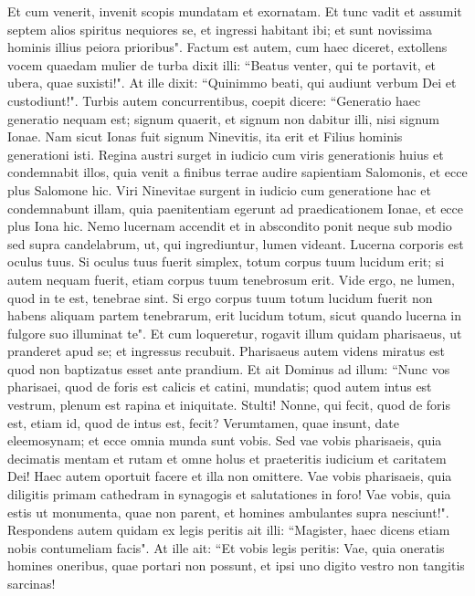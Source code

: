 \begin{biblechapter}
\verse Et cum venerit, invenit scopis mundatam et exornatam. 
\verse Et tunc vadit et assumit septem alios spiritus nequiores se, et ingressi habitant ibi; et sunt novissima hominis illius peiora prioribus". 
\verse Factum est autem, cum haec diceret, extollens vocem quaedam mulier de turba dixit illi: “Beatus venter, qui te portavit, et ubera, quae suxisti!". 
\verse At ille dixit: “Quinimmo beati, qui audiunt verbum Dei et custodiunt!". 
\verse Turbis autem concurrentibus, coepit dicere: “Generatio haec generatio nequam est; signum quaerit, et signum non dabitur illi, nisi signum Ionae. 
\verse Nam sicut Ionas fuit signum Ninevitis, ita erit et Filius hominis generationi isti.  
\verse Regina austri surget in iudicio cum viris generationis huius et condemnabit illos, quia venit a finibus terrae audire sapientiam Salomonis, et ecce plus Salomone hic. 
\verse Viri Ninevitae surgent in iudicio cum generatione hac et condemnabunt illam, quia paenitentiam egerunt ad praedicationem Ionae, et ecce plus Iona hic. 
\verse Nemo lucernam accendit et in abscondito ponit neque sub modio sed supra candelabrum, ut, qui ingrediuntur, lumen videant. 
\verse Lucerna corporis est oculus tuus. Si oculus tuus fuerit simplex, totum corpus tuum lucidum erit; si autem nequam fuerit, etiam corpus tuum tenebrosum erit. 
\verse Vide ergo, ne lumen, quod in te est, tenebrae sint. 
\verse Si ergo corpus tuum totum lucidum fuerit non habens aliquam partem tenebrarum, erit lucidum totum, sicut quando lucerna in fulgore suo illuminat te". 
\verse Et cum loqueretur, rogavit illum quidam pharisaeus, ut pranderet apud se; et ingressus recubuit. 
\verse Pharisaeus autem videns miratus est quod non baptizatus esset ante prandium. 
\verse Et ait Dominus ad illum: “Nunc vos pharisaei, quod de foris est calicis et catini, mundatis; quod autem intus est vestrum, plenum est rapina et iniquitate. 
\verse Stulti! Nonne, qui fecit, quod de foris est, etiam id, quod de intus est, fecit? 
\verse Verumtamen, quae insunt, date eleemosynam; et ecce omnia munda sunt vobis. 
\verse Sed vae vobis pharisaeis, quia decimatis mentam et rutam et omne holus et praeteritis iudicium et caritatem Dei! Haec autem oportuit facere et illa non omittere. 
\verse Vae vobis pharisaeis, quia diligitis primam cathedram in synagogis et salutationes in foro! 
\verse Vae vobis, quia estis ut monumenta, quae non parent, et homines ambulantes supra nesciunt!". 
\verse Respondens autem quidam ex legis peritis ait illi: “Magister, haec dicens etiam nobis contumeliam facis". 
\verse At ille ait: “Et vobis legis peritis: Vae, quia oneratis homines oneribus, quae portari non possunt, et ipsi uno digito vestro non tangitis sarcinas! 

\end{biblechapter}
